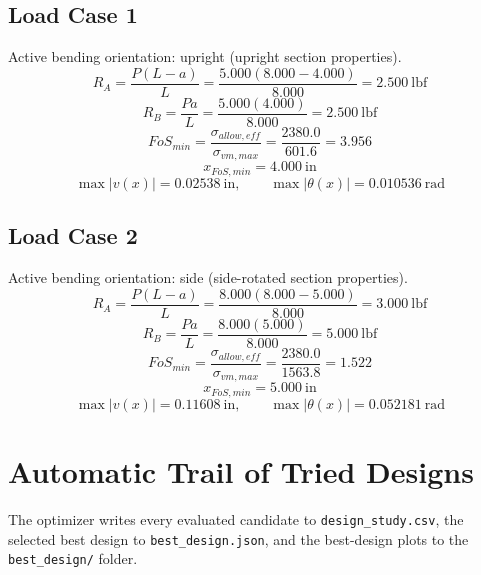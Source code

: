 \documentclass[11pt]{article}
\begin{document}
\subsection*{Load Case 1}
Active bending orientation: upright (upright section properties).
\[R_A = \frac{P(L-a)}{L} = \frac{5.000(8.000-4.000)}{8.000} = 2.500\ \mathrm{lbf}\]
\[R_B = \frac{Pa}{L} = \frac{5.000(4.000)}{8.000} = 2.500\ \mathrm{lbf}\]
\[FoS_{min} = \frac{\sigma_{allow,eff}}{\sigma_{vm,max}} = \frac{2380.0}{601.6} = 3.956\]
\[x_{FoS,min} = 4.000\ \mathrm{in}\]
\[\max |v(x)| = 0.02538\ \mathrm{in}, \qquad \max |\theta(x)| = 0.010536\ \mathrm{rad}\]
\subsection*{Load Case 2}
Active bending orientation: side (side-rotated section properties).
\[R_A = \frac{P(L-a)}{L} = \frac{8.000(8.000-5.000)}{8.000} = 3.000\ \mathrm{lbf}\]
\[R_B = \frac{Pa}{L} = \frac{8.000(5.000)}{8.000} = 5.000\ \mathrm{lbf}\]
\[FoS_{min} = \frac{\sigma_{allow,eff}}{\sigma_{vm,max}} = \frac{2380.0}{1563.8} = 1.522\]
\[x_{FoS,min} = 5.000\ \mathrm{in}\]
\[\max |v(x)| = 0.11608\ \mathrm{in}, \qquad \max |\theta(x)| = 0.052181\ \mathrm{rad}\]

\section*{Automatic Trail of Tried Designs}
The optimizer writes every evaluated candidate to \texttt{design\_study.csv}, the selected best design to \texttt{best\_design.json}, and the best-design plots to the \texttt{best\_design/} folder.
\end{document}
